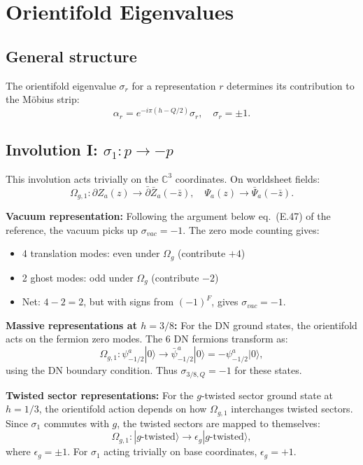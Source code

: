 \documentclass[11pt]{article}
\newcommand{\C}{\mathbb{C}}
\newcommand{\oo}{\Omega_g}
\begin{document}
\section{Orientifold Eigenvalues}\label{app:orient}

\subsection{General structure}

The orientifold eigenvalue $\sigma_r$ for a representation $r$ determines its contribution to the M\"obius strip:
\begin{equation}
\alpha_r = e^{-i\pi(h - Q/2)} \sigma_r, \quad \sigma_r = \pm 1.
\end{equation}

\subsection{Involution I: $\sigma_1: p \to -p$}

This involution acts trivially on the $\C^3$ coordinates. On worldsheet fields:
\begin{equation}
\Omega_{g,1}: \partial Z_a(z) \to \bar{\partial} \bar{Z}_a(-\bar{z}), \quad \Psi_a(z) \to \bar{\Psi}_a(-\bar{z}).
\end{equation}

\textbf{Vacuum representation:}
Following the argument below eq.~(E.47) of the reference, the vacuum picks up $\sigma_{vac} = -1$. The zero mode counting gives:
\begin{itemize}
\item 4 translation modes: even under $\oo$ (contribute $+4$)
\item 2 ghost modes: odd under $\oo$ (contribute $-2$)
\item Net: $4 - 2 = 2$, but with signs from $(-1)^F$, gives $\sigma_{vac} = -1$.
\end{itemize}

\textbf{Massive representations at $h = 3/8$:}
For the DN ground states, the orientifold acts on the fermion zero modes. The 6 DN fermions transform as:
\begin{equation}
\Omega_{g,1}: \psi^a_{-1/2} |0\rangle \to \bar{\psi}^a_{-1/2} |0\rangle = -\psi^a_{-1/2} |0\rangle,
\end{equation}
using the DN boundary condition. Thus $\sigma_{3/8, Q} = -1$ for these states.

\textbf{Twisted sector representations:}
For the $g$-twisted sector ground state at $h = 1/3$, the orientifold action depends on how $\Omega_{g,1}$ interchanges twisted sectors. Since $\sigma_1$ commutes with $g$, the twisted sectors are mapped to themselves:
\begin{equation}
\Omega_{g,1}: |g\text{-twisted}\rangle \to \epsilon_g |g\text{-twisted}\rangle,
\end{equation}
where $\epsilon_g = \pm 1$. For $\sigma_1$ acting trivially on base coordinates, $\epsilon_g = +1$.
\end{document}
